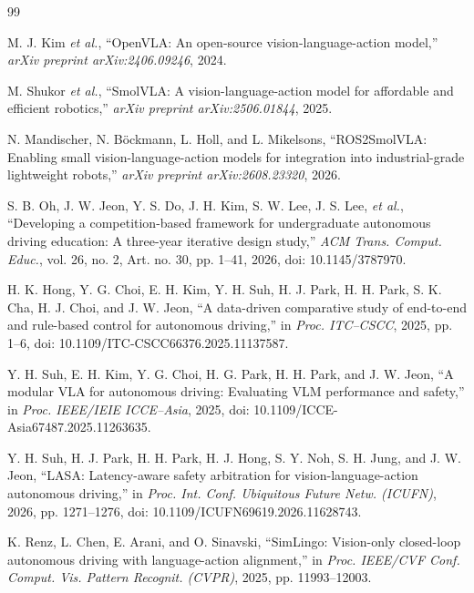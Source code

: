 \documentclass[letterpaper,conference]{IEEEtran}
\begin{document}
\begin{thebibliography}{99}
\setlength{\itemsep}{0pt}
\setlength{\parsep}{0pt}

M. J. Kim \emph{et al.},
``OpenVLA: An open-source vision-language-action model,''
\emph{arXiv preprint arXiv:2406.09246}, 2024.

M. Shukor \emph{et al.},
``SmolVLA: A vision-language-action model for affordable and efficient robotics,''
\emph{arXiv preprint arXiv:2506.01844}, 2025.

N. Mandischer, N. B{\"o}ckmann, L. Holl, and L. Mikelsons,
``ROS2SmolVLA: Enabling small vision-language-action models for integration
into industrial-grade lightweight robots,''
\emph{arXiv preprint arXiv:2608.23320}, 2026.

S. B. Oh, J. W. Jeon, Y. S. Do, J. H. Kim, S. W. Lee, J. S. Lee,
\emph{et al.}, ``Developing a competition-based framework for undergraduate
autonomous driving education: A three-year iterative design study,''
\emph{ACM Trans. Comput. Educ.}, vol. 26, no. 2, Art. no. 30,
pp. 1--41, 2026, doi: 10.1145/3787970.

H. K. Hong, Y. G. Choi, E. H. Kim, Y. H. Suh, H. J. Park, H. H. Park,
S. K. Cha, H. J. Choi, and J. W. Jeon, ``A data-driven comparative study of
end-to-end and rule-based control for autonomous driving,'' in
\emph{Proc. ITC--CSCC}, 2025, pp. 1--6,
doi: 10.1109/ITC-CSCC66376.2025.11137587.

Y. H. Suh, E. H. Kim, Y. G. Choi, H. G. Park, H. H. Park, and J. W. Jeon,
``A modular VLA for autonomous driving: Evaluating VLM performance and
safety,'' in \emph{Proc. IEEE/IEIE ICCE--Asia}, 2025,
doi: 10.1109/ICCE-Asia67487.2025.11263635.

Y. H. Suh, H. J. Park, H. H. Park, H. J. Hong, S. Y. Noh, S. H. Jung,
and J. W. Jeon, ``LASA: Latency-aware safety arbitration for
vision-language-action autonomous driving,'' in \emph{Proc. Int. Conf.
Ubiquitous Future Netw. (ICUFN)}, 2026, pp. 1271--1276,
doi: 10.1109/ICUFN69619.2026.11628743.

K. Renz, L. Chen, E. Arani, and O. Sinavski,
``SimLingo: Vision-only closed-loop autonomous driving with language-action alignment,''
in \emph{Proc. IEEE/CVF Conf. Comput. Vis. Pattern Recognit. (CVPR)},
2025, pp. 11993--12003.


\end{thebibliography}
\end{document}
